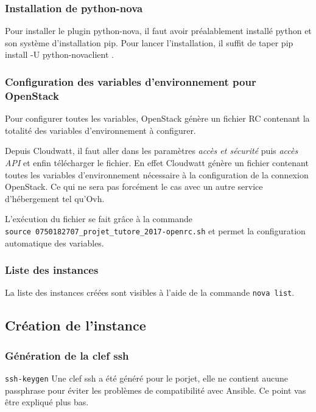 \documentclass[]{article}
\begin{document}
\subsubsection{Installation de
python-nova}\label{installation-de-python-nova}

Pour installer le plugin python-nova, il faut avoir préalablement
installé python et son système d'installation pip. Pour lancer
l'installation, il suffit de taper pip install -U python-novaclient .

\subsubsection{Configuration des variables d'environnement pour
OpenStack}\label{configuration-des-variables-denvironnement-pour-OpenStack}

Pour configurer toutes les variables, OpenStack génère un fichier RC
contenant la totalité des variables d'environnement à configurer.

Depuis Cloudwatt, il faut aller dans les paramètres \emph{accès et
sécurité} puis \emph{accès API} et enfin télécharger le fichier. En
effet Cloudwatt génère un fichier contenant toutes les variables
d'environnement nécessaire à la configuration de la connexion OpenStack.
Ce qui ne sera pas forcément le cas avec un autre service d'hébergement tel qu'Ovh.

L'exécution du fichier se fait grâce à la commande
\texttt{source\ 0750182707\_projet\_tutore\_2017-openrc.sh} et permet la
configuration automatique des variables.

\subsubsection{Liste des instances}\label{liste-des-instances}

La liste des instances créées sont visibles à l'aide de la commande
\texttt{nova\ list}.

\subsection{Création de l'instance}\label{cruxe9ation-de-linstance}

\subsubsection{Génération de la clef
ssh}\label{guxe9nuxe9ration-de-la-clef-ssh}

\texttt{ssh-keygen}
Une clef ssh a été généré pour le porjet, elle ne contient aucune passphrase pour éviter les problèmes de compatibilité avec Ansible. Ce point vas être expliqué plus bas.
\end{document}
